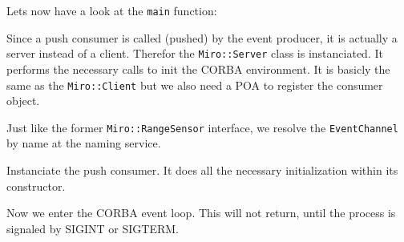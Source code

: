 

Lets now have a look at the \lstinline!main! function:



Since a push consumer is called (pushed) by the event producer, it is
actually a server instead of a client. Therefor the
\lstinline!Miro::Server!  class is instanciated. It performs the
necessary calls to init the CORBA environment. It is basicly the same
as the \lstinline!Miro::Client!  but we also need a POA to register
the consumer object.



Just like the former \lstinline!Miro::RangeSensor! interface, we
resolve the \lstinline!EventChannel! by name at the naming service.



Instanciate the push consumer. It does all the necessary
initialization within its constructor.



Now we enter the CORBA event loop. This will not return, until the
process is signaled by SIGINT or SIGTERM.

